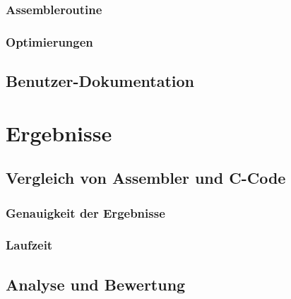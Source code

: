 \documentclass[11pt]{scrartcl}
\begin{document}
\subsubsection{Assembleroutine}
\subsubsection{Optimierungen}
\subsection{Benutzer-Dokumentation}

\section{Ergebnisse}
\subsection{Vergleich von Assembler und C-Code}
\subsubsection{Genauigkeit der Ergebnisse}
\subsubsection{Laufzeit}
\subsection{Analyse und Bewertung}
\end{document}
